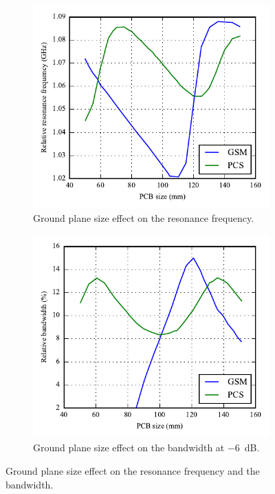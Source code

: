 \begin{figure}[htbp]
   \begin{subfigure}[b]{0.49\linewidth}
        \centering
        \includegraphics{img/analysis/pcbsize_freq.pdf}
        \caption{Ground plane size effect on the resonance frequency.}
    \end{subfigure}
    \hfill
    \begin{subfigure}[b]{0.49\linewidth}
        \centering
        \includegraphics{img/analysis/pcbsize_bandwidth.pdf}
        \caption{Ground plane size effect on the bandwidth at \SI{-6}{dB}.}
    \end{subfigure}
    \caption{Ground plane size effect on the resonance frequency and the bandwidth\cite{sanchez2008multiband}.}
    \label{fig:antenna_pcb_behavior}
\end{figure}


